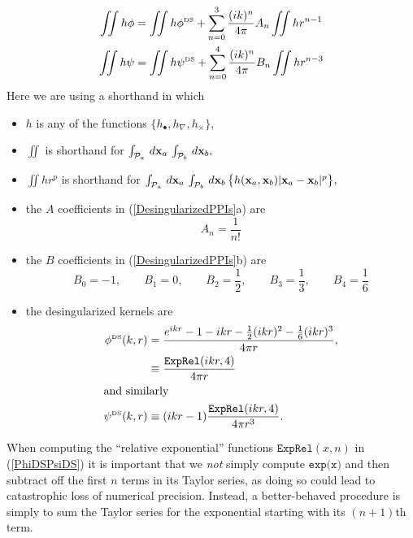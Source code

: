 \documentclass[letterpaper]{article}
\begin{document}
\begin{subequations}
\begin{align}
 \iint h \phi
&=
 \iint h \phi^{\hbox{\tiny{DS}}}
+\sum_{n=0}^3 \frac{(ik)^n}{4\pi} A_n  
 \iint h r^{n-1}
\\
 \iint h\psi
&=
 \iint h\psi^{\hbox{\tiny{DS}}}
+\sum_{n=0}^4 \frac{(ik)^n}{4\pi} B_n 
 \iint h r^{n-3}
\end{align}
\label{DesingularizedPPIs}
\end{subequations}
Here we are using a shorthand in which 
\begin{itemize}
 \item $h$ is any of the functions $\{h_\bullet, h_\nabla, h_\times\}$,
 \item $\iint$ is shorthand for 
       $\int_{\mathcal{P}_a} \, d\mathbf{x}_a \, \int_{\mathcal{P}_b} \, d\mathbf{x}_b, $
 \item $\iint h r^p$ is shorthand for 
       $\int_{\mathcal{P}_a} \, d\mathbf{x}_a \, \int_{\mathcal{P}_b} \, d\mathbf{x}_b\,
        \big\{h(\mathbf{x}_a, \mathbf{x}_b) |\mathbf{x}_a - \mathbf{x}_b|^p\big\},$
 \item the $A$ coefficients in (\ref{DesingularizedPPIs}a) are 
       $$A_n=\frac{1}{n!}$$
 \item the $B$ coefficients in (\ref{DesingularizedPPIs}b) are 
       $$ B_0 = -1, \qquad B_1 = 0, \qquad B_2 = \frac{1}{2}, \qquad
          B_3 = \frac{1}{3}, \qquad B_4 = \frac{1}{6}
       $$
 \item the desingularized kernels are 
\begin{subequations}
\begin{align}
\phi^{\hbox{\tiny{DS}}}(k, r) 
 &=
\frac{e^{ikr} - 1 - ikr - \frac{1}{2}(ikr)^2 - \frac{1}{6}(ikr)^3 }
     {4\pi r}, 
\nonumber \\
&\equiv\frac{\texttt{ExpRel}(ikr, 4)}{4\pi r}
\\
\intertext{and similarly}
\psi^{\hbox{\tiny{DS}}}(k, r)&\equiv(ikr-1)\frac{\texttt{ExpRel}(ikr, 4)}{4\pi r^3}.
\end{align}
\label{PhiDSPsiDS}
\end{subequations}
\end{itemize}
When computing the ``relative exponential'' functions 
$\texttt{ExpRel}(x,n)$ in (\ref{PhiDSPsiDS}) it is 
important that we \textit{not} simply compute 
$\texttt{exp(x)}$ and then subtract off the first $n$ terms
in its Taylor series, as doing so could lead to catastrophic loss
of numerical precision. Instead, a better-behaved procedure is 
simply to sum the Taylor series for the exponential starting 
with its $(n+1)$th term.
\end{document}
